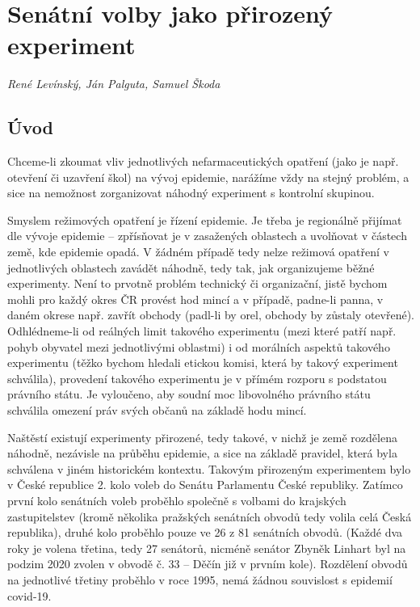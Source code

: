 
\chapter{Senátní volby jako přirozený experiment}\label{Prirozene_experimenty}

\textit{René Levínský, Ján Palguta, Samuel Škoda}

\section*{Úvod}
Chceme-li zkoumat vliv jednotlivých nefarmaceutických opatření (jako je např. otevření či uzavření škol) na vývoj epidemie, narážíme vždy na stejný problém, a sice na nemožnost zorganizovat náhodný experiment s kontrolní skupinou. 

Smyslem režimových opatření je řízení epidemie. Je třeba je regionálně přijímat dle vývoje epidemie -- zpřísňovat je v zasažených oblastech a uvolňovat v částech země, kde epidemie opadá. V žádném případě tedy nelze režimová opatření v jednotlivých oblastech zavádět náhodně, tedy tak, jak organizujeme běžné experimenty. Není to prvotně problém technický či organizační, jistě bychom mohli pro každý okres ČR provést hod mincí a v případě, padne-li panna, v daném okrese např. zavřít obchody (padl-li by orel, obchody by zůstaly otevřené). Odhlédneme-li od reálných limit takového experimentu (mezi které patří např. pohyb obyvatel mezi jednotlivými oblastmi) i od morálních aspektů takového experimentu (těžko bychom hledali etickou komisi, která by takový experiment schválila), provedení takového experimentu je v přímém rozporu s podstatou právního státu. Je vyloučeno, aby soudní moc libovolného právního státu schválila omezení práv svých občanů na základě hodu mincí.

Naštěstí existují experimenty přirozené, tedy takové, v nichž je země rozdělena náhodně, nezávisle na průběhu epidemie, a sice na základě pravidel, která byla schválena v jiném historickém kontextu. Takovým přirozeným experimentem bylo v České republice 2. kolo voleb do Senátu Parlamentu České republiky. Zatímco první kolo senátních voleb proběhlo společně s volbami do krajských zastupitelstev (kromě několika pražských senátních obvodů tedy volila celá Česká republika), druhé kolo proběhlo pouze ve 26 z 81 senátních obvodů. (Každé dva roky je volena třetina, tedy 27 senátorů, nicméně senátor Zbyněk Linhart byl na podzim 2020 zvolen v obvodě č. 33 -- Děčín již v prvním kole). Rozdělení obvodů na jednotlivé třetiny 
proběhlo v roce 1995, nemá žádnou souvislost s epidemií covid-19. 

